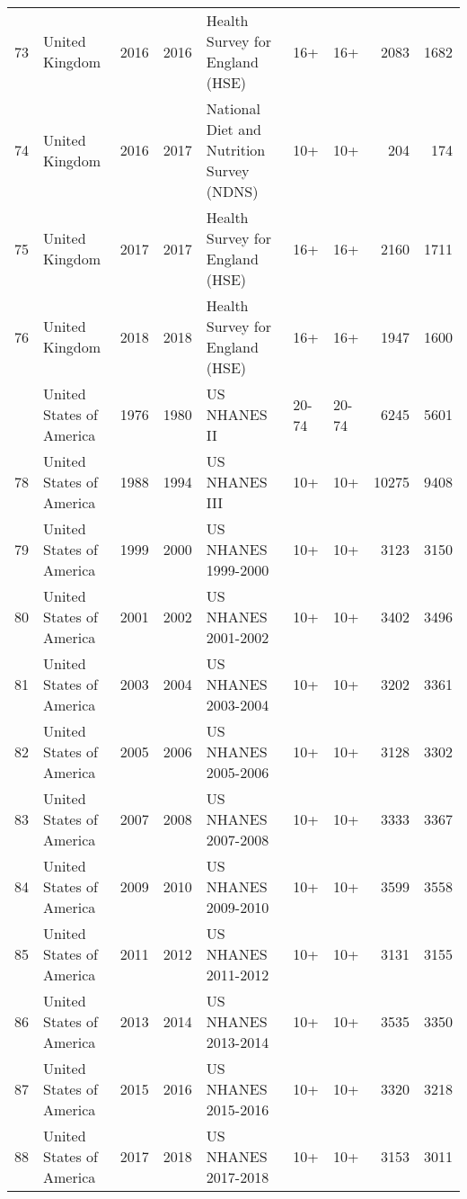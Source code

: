 \begin{longtable}[t]{rlrrlllrr}
73 & United Kingdom & 2016 & 2016 & Health Survey for England (HSE) & 16+ & 16+ & 2083 & 1682\\
74 & United Kingdom & 2016 & 2017 & National Diet and Nutrition Survey (NDNS) & 10+ & 10+ & 204 & 174\\
75 & United Kingdom & 2017 & 2017 & Health Survey for England (HSE) & 16+ & 16+ & 2160 & 1711\\
76 & United Kingdom & 2018 & 2018 & Health Survey for England (HSE) & 16+ & 16+ & 1947 & 1600\\
\addlinespace
77 & United States of America & 1976 & 1980 & US NHANES II & 20-74 & 20-74 & 6245 & 5601\\
78 & United States of America & 1988 & 1994 & US NHANES III & 10+ & 10+ & 10275 & 9408\\
79 & United States of America & 1999 & 2000 & US NHANES 1999-2000 & 10+ & 10+ & 3123 & 3150\\
80 & United States of America & 2001 & 2002 & US NHANES 2001-2002 & 10+ & 10+ & 3402 & 3496\\
81 & United States of America & 2003 & 2004 & US NHANES 2003-2004 & 10+ & 10+ & 3202 & 3361\\
82 & United States of America & 2005 & 2006 & US NHANES 2005-2006 & 10+ & 10+ & 3128 & 3302\\
83 & United States of America & 2007 & 2008 & US NHANES 2007-2008 & 10+ & 10+ & 3333 & 3367\\
84 & United States of America & 2009 & 2010 & US NHANES 2009-2010 & 10+ & 10+ & 3599 & 3558\\
85 & United States of America & 2011 & 2012 & US NHANES 2011-2012 & 10+ & 10+ & 3131 & 3155\\
86 & United States of America & 2013 & 2014 & US NHANES 2013-2014 & 10+ & 10+ & 3535 & 3350\\
87 & United States of America & 2015 & 2016 & US NHANES 2015-2016 & 10+ & 10+ & 3320 & 3218\\
88 & United States of America & 2017 & 2018 & US NHANES 2017-2018 & 10+ & 10+ & 3153 & 3011\\*
\end{longtable}
\endgroup{}

